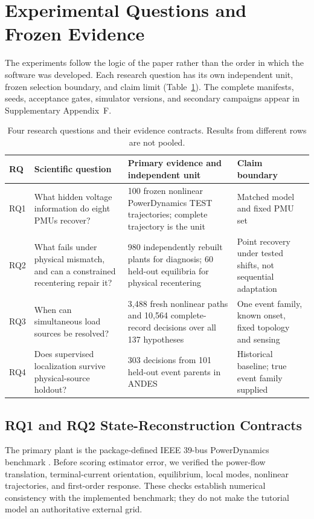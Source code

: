 \section{Experimental Questions and Frozen Evidence}
\label{sec:experimental-protocol}

The experiments follow the logic of the paper rather than the order in which the software was developed. Each research question has its own independent unit, frozen selection boundary, and claim limit (Table~\ref{tab:experimental-contracts}). The complete manifests, seeds, acceptance gates, simulator versions, and secondary campaigns appear in Supplementary Appendix~F.

\begin{table}[t]
\caption{Four research questions and their evidence contracts. Results from different rows are not pooled.}
\label{tab:experimental-contracts}
\centering
\footnotesize
\begin{tabularx}{\textwidth}{@{}p{0.8cm}XXX@{}}
\toprule
RQ & Scientific question & Primary evidence and independent unit & Claim boundary \\
\midrule
RQ1 & What hidden voltage information do eight PMUs recover? & 100 frozen nonlinear PowerDynamics TEST trajectories; complete trajectory is the unit & Matched model and fixed PMU set \\
RQ2 & What fails under physical mismatch, and can a constrained recentering repair it? & 980 independently rebuilt plants for diagnosis; 60 held-out equilibria for physical recentering & Point recovery under tested shifts, not sequential adaptation \\
RQ3 & When can simultaneous load sources be resolved? & 3,488 fresh nonlinear paths and 10,564 complete-record decisions over all 137 hypotheses & One event family, known onset, fixed topology and sensing \\
RQ4 & Does supervised localization survive physical-source holdout? & 303 decisions from 101 held-out event parents in ANDES & Historical baseline; true event family supplied \\
\bottomrule
\end{tabularx}
\end{table}

\subsection{RQ1 and RQ2 State-Reconstruction Contracts}

The primary plant is the package-defined IEEE 39-bus PowerDynamics benchmark \cite{plietzsch2022powerdynamics}. Before scoring estimator error, we verified the power-flow translation, terminal-current orientation, equilibrium, local modes, nonlinear trajectories, and first-order response. These checks establish numerical consistency with the implemented benchmark; they do not make the tutorial model an authoritative external grid.

